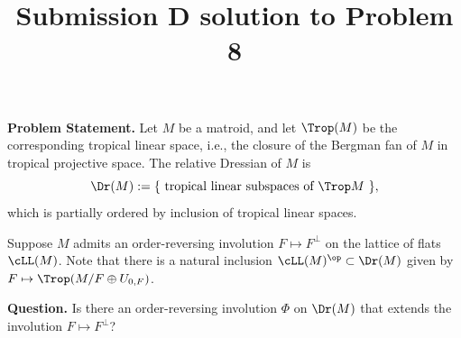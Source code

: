 \title{Submission D solution to Problem 8}
\date{}
\maketitle


\noindent \textbf{Problem Statement.} Let $M$ be a matroid, and let $\Trop(M)$ be the corresponding tropical linear space, i.e., the closure of the Bergman fan of $M$ in tropical projective space. The relative Dressian of $M$ is 
\[ \Dr(M) :=\{\text{ tropical linear subspaces of $\Trop M$ }\}, \]
which is partially ordered by inclusion of tropical linear spaces. 

Suppose $M$ admits an order-reversing involution $F\mapsto F^\perp$ on the lattice of flats $\cLL(M)$. Note that there is a natural inclusion $\cLL(M)^{\op} \subset \Dr(M)$ given by $F\mapsto \Trop(M/F\oplus U_{0,F})$.

\medskip
\noindent \textbf{Question.} Is there an order-reversing involution $\Phi$ on $\Dr(M)$ that extends the involution $F\mapsto F^\perp$?

\bigskip

